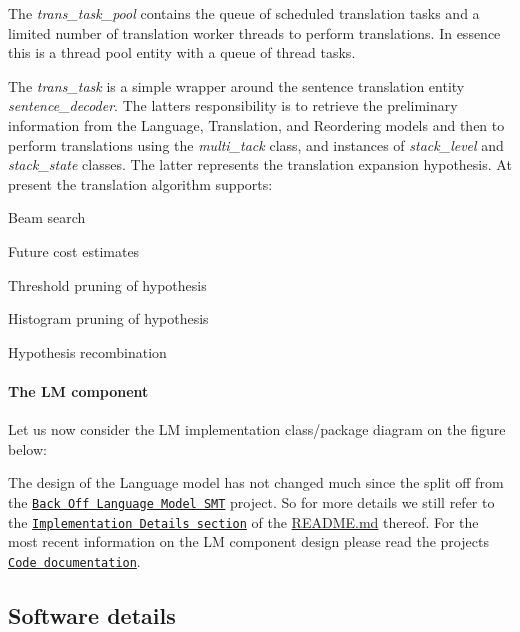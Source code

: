 The {\itshape trans\+\_\+task\+\_\+pool} contains the queue of scheduled translation tasks and a limited number of translation worker threads to perform translations. In essence this is a thread pool entity with a queue of thread tasks.

The {\itshape trans\+\_\+task} is a simple wrapper around the sentence translation entity {\itshape sentence\+\_\+decoder}. The latter\textquotesingle{}s responsibility is to retrieve the preliminary information from the Language, Translation, and Reordering models and then to perform translations using the {\itshape multi\+\_\+tack} class, and instances of {\itshape stack\+\_\+level} and {\itshape stack\+\_\+state} classes. The latter represents the translation expansion hypothesis. At present the translation algorithm supports\+:


\begin{DoxyItemize}
\item Beam search
\item Future cost estimates
\item Threshold pruning of hypothesis
\item Histogram pruning of hypothesis
\item Hypothesis recombination
\end{DoxyItemize}

\paragraph*{The L\+M component}

Let us now consider the L\+M implementation class/package diagram on the figure below\+:



The design of the Language model has not changed much since the split off from the \href{https://github.com/ivan-zapreev/Back-Off-Language-Model-SMT}{\tt Back Off Language Model S\+M\+T} project. So for more details we still refer to the \href{https://github.com/ivan-zapreev/Back-Off-Language-Model-SMT/blob/master/README.md#implementation-details}{\tt Implementation Details section} of the \hyperlink{_r_e_a_d_m_e_8md}{R\+E\+A\+D\+M\+E.\+md} thereof. For the most recent information on the L\+M component design please read the project\textquotesingle{}s \href{#code-documentation}{\tt Code documentation}.

\subsection*{Software details}

